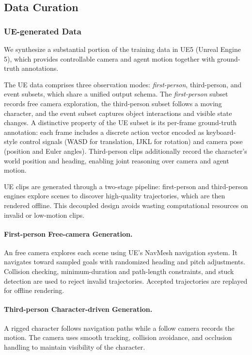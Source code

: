 \documentclass{llmxive}
\begin{document}
\subsection{Data Curation}

\subsubsection{UE-generated Data}
\label{sec:ue_data}

We synthesize a substantial portion of the training data in UE5 (Unreal Engine 5), which provides controllable camera and agent motion together with ground-truth annotations.

The UE data comprises three observation modes: \textit{first-person}, third-person, and event subsets, which share a unified output schema. The \textit{first-person} subset records free camera exploration, the third-person subset follows a moving character, and the event subset captures object interactions and visible state changes. A distinctive property of the UE subset is its per-frame ground-truth annotation: each frame includes a discrete action vector encoded as keyboard-style control signals (WASD for translation, IJKL for rotation) and camera pose (position and Euler angles). Third-person clips additionally record the character's world position and heading, enabling joint reasoning over camera and agent motion.

UE clips are generated through a two-stage pipeline: first-person and third-person engines explore scenes to discover high-quality trajectories, which are then rendered offline. This decoupled design avoids wasting computational resources on invalid or low-motion clips.

\paragraph{\bf{First-person Free-camera Generation.}}
 
An free camera explores each scene using UE's NavMesh navigation system. It navigates toward sampled goals with randomized heading and pitch adjustments. Collision checking, minimum-duration and path-length constraints, and stuck detection are used to reject invalid trajectories. Accepted trajectories are replayed for offline rendering.

\paragraph{\bf{Third-person Character-driven Generation.}}
A rigged character follows navigation paths while a follow camera records the motion. The camera uses smooth tracking, collision avoidance, and occlusion handling to maintain visibility of the character.
\end{document}
